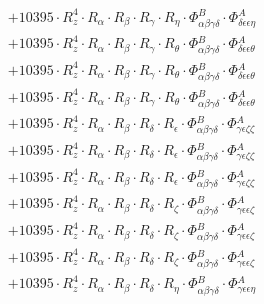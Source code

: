 \documentclass{article}
\begin{document}
\begin{subequations}
\begin{gather}
\begin{array}{c}
 \\[0.2em] 		 + 10395 \cdot R_{z}^{4} \cdot R_{\alpha{}} \cdot R_{\beta{}} \cdot R_{\gamma{}} \cdot R_{\eta{}} \cdot \Phi{}^{B}_{\alpha{}\beta{}\gamma{}\delta{}} \cdot \Phi{}^{A}_{\delta{}\epsilon{}\epsilon{}\eta{}} 
 \\[0.2em] 		 + 10395 \cdot R_{z}^{4} \cdot R_{\alpha{}} \cdot R_{\beta{}} \cdot R_{\gamma{}} \cdot R_{\theta{}} \cdot \Phi{}^{B}_{\alpha{}\beta{}\gamma{}\delta{}} \cdot \Phi{}^{A}_{\delta{}\epsilon{}\epsilon{}\theta{}} 
 \\[0.2em] 		 + 10395 \cdot R_{z}^{4} \cdot R_{\alpha{}} \cdot R_{\beta{}} \cdot R_{\gamma{}} \cdot R_{\theta{}} \cdot \Phi{}^{B}_{\alpha{}\beta{}\gamma{}\delta{}} \cdot \Phi{}^{A}_{\delta{}\epsilon{}\epsilon{}\theta{}} 
 \\[0.2em] 		 + 10395 \cdot R_{z}^{4} \cdot R_{\alpha{}} \cdot R_{\beta{}} \cdot R_{\gamma{}} \cdot R_{\theta{}} \cdot \Phi{}^{B}_{\alpha{}\beta{}\gamma{}\delta{}} \cdot \Phi{}^{A}_{\delta{}\epsilon{}\epsilon{}\theta{}} 
 \\[0.2em] 		 + 10395 \cdot R_{z}^{4} \cdot R_{\alpha{}} \cdot R_{\beta{}} \cdot R_{\delta{}} \cdot R_{\epsilon{}} \cdot \Phi{}^{B}_{\alpha{}\beta{}\gamma{}\delta{}} \cdot \Phi{}^{A}_{\gamma{}\epsilon{}\zeta{}\zeta{}} 
 \\[0.2em] 		 + 10395 \cdot R_{z}^{4} \cdot R_{\alpha{}} \cdot R_{\beta{}} \cdot R_{\delta{}} \cdot R_{\epsilon{}} \cdot \Phi{}^{B}_{\alpha{}\beta{}\gamma{}\delta{}} \cdot \Phi{}^{A}_{\gamma{}\epsilon{}\zeta{}\zeta{}} 
 \\[0.2em] 		 + 10395 \cdot R_{z}^{4} \cdot R_{\alpha{}} \cdot R_{\beta{}} \cdot R_{\delta{}} \cdot R_{\epsilon{}} \cdot \Phi{}^{B}_{\alpha{}\beta{}\gamma{}\delta{}} \cdot \Phi{}^{A}_{\gamma{}\epsilon{}\zeta{}\zeta{}} 
 \\[0.2em] 		 + 10395 \cdot R_{z}^{4} \cdot R_{\alpha{}} \cdot R_{\beta{}} \cdot R_{\delta{}} \cdot R_{\zeta{}} \cdot \Phi{}^{B}_{\alpha{}\beta{}\gamma{}\delta{}} \cdot \Phi{}^{A}_{\gamma{}\epsilon{}\epsilon{}\zeta{}} 
 \\[0.2em] 		 + 10395 \cdot R_{z}^{4} \cdot R_{\alpha{}} \cdot R_{\beta{}} \cdot R_{\delta{}} \cdot R_{\zeta{}} \cdot \Phi{}^{B}_{\alpha{}\beta{}\gamma{}\delta{}} \cdot \Phi{}^{A}_{\gamma{}\epsilon{}\epsilon{}\zeta{}} 
 \\[0.2em] 		 + 10395 \cdot R_{z}^{4} \cdot R_{\alpha{}} \cdot R_{\beta{}} \cdot R_{\delta{}} \cdot R_{\zeta{}} \cdot \Phi{}^{B}_{\alpha{}\beta{}\gamma{}\delta{}} \cdot \Phi{}^{A}_{\gamma{}\epsilon{}\epsilon{}\zeta{}} 
 \\[0.2em] 		 + 10395 \cdot R_{z}^{4} \cdot R_{\alpha{}} \cdot R_{\beta{}} \cdot R_{\delta{}} \cdot R_{\eta{}} \cdot \Phi{}^{B}_{\alpha{}\beta{}\gamma{}\delta{}} \cdot \Phi{}^{A}_{\gamma{}\epsilon{}\epsilon{}\eta{}} 

\end{array}
\end{gather}
\end{subequations}
\end{document}
